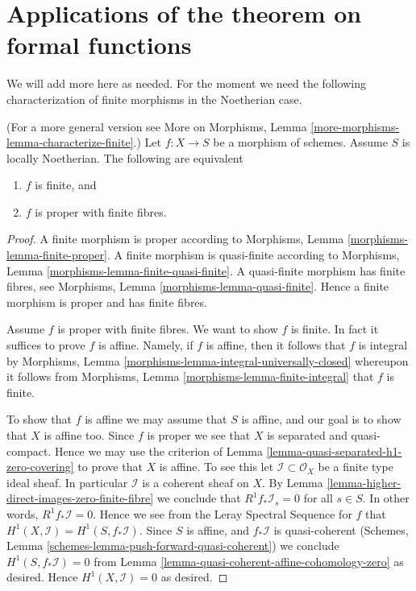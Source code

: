 \section{Applications of the theorem on formal functions}
\label{section-applications-formal-functions}


\noindent
We will add more here as needed. For the moment we need the
following characterization of finite morphisms in the Noetherian case.

\begin{lemma}
\label{lemma-characterize-finite}
(For a more general version see
More on Morphisms, Lemma \ref{more-morphisms-lemma-characterize-finite}.)
Let $f : X \to S$ be a morphism of schemes.
Assume $S$ is locally Noetherian.
The following are equivalent
\begin{enumerate}
\item $f$ is finite, and
\item $f$ is proper with finite fibres.
\end{enumerate}
\end{lemma}

\begin{proof}
A finite morphism is proper according to
Morphisms, Lemma \ref{morphisms-lemma-finite-proper}.
A finite morphism is quasi-finite according to
Morphisms, Lemma \ref{morphisms-lemma-finite-quasi-finite}.
A quasi-finite morphism has finite fibres, see
Morphisms, Lemma \ref{morphisms-lemma-quasi-finite}.
Hence a finite morphism is proper and has finite fibres.

\medskip\noindent
Assume $f$ is proper with finite fibres.
We want to show $f$ is finite.
In fact it suffices to prove $f$ is affine.
Namely, if $f$ is affine, then it follows that
$f$ is integral by
Morphisms, Lemma \ref{morphisms-lemma-integral-universally-closed}
whereupon it follows from
Morphisms, Lemma \ref{morphisms-lemma-finite-integral}
that $f$ is finite.

\medskip\noindent
To show that $f$ is affine we may assume that $S$ is affine, and our
goal is to show that $X$ is affine too.
Since $f$ is proper we see that $X$ is separated and quasi-compact.
Hence we may use the criterion of
Lemma \ref{lemma-quasi-separated-h1-zero-covering} to prove that $X$
is affine. To see this let $\mathcal{I} \subset \mathcal{O}_X$
be a finite type ideal sheaf. In particular $\mathcal{I}$ is
a coherent sheaf on $X$. By
Lemma \ref{lemma-higher-direct-images-zero-finite-fibre} we conclude that
$R^1f_*\mathcal{I}_s = 0$ for all $s \in S$.
In other words, $R^1f_*\mathcal{I} = 0$. Hence we see from
the Leray Spectral Sequence for $f$ that
$H^1(X , \mathcal{I}) = H^1(S, f_*\mathcal{I})$.
Since $S$ is affine, and $f_*\mathcal{I}$ is quasi-coherent
(Schemes, Lemma \ref{schemes-lemma-push-forward-quasi-coherent})
we conclude $H^1(S, f_*\mathcal{I}) = 0$
from Lemma \ref{lemma-quasi-coherent-affine-cohomology-zero}
as desired. Hence $H^1(X, \mathcal{I}) = 0$ as desired.
\end{proof}

